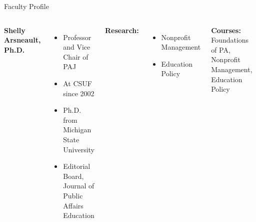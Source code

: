 \documentclass[10pt]{beamer}
\newlength{\imageheight}
\begin{document}
    \begin{frame}{Faculty Profile}
    \begin{columns}[T]
    \textbf{Shelly Arsneault, Ph.D.}
    \begin{itemize}
    \item Professor and Vice Chair of PAJ
    \item At CSUF since 2002
    \item Ph.D. from Michigan State University
    \item Editorial Board, Journal of Public Affairs Education
    \end{itemize}
    
    \textbf{Research:} 
    \begin{itemize}
    \item Nonprofit Management
    \item Education Policy
    \end{itemize}

    \textbf{Courses:} Foundations of PA, Nonprofit Management, Education Policy
    
    \vspace*{0.5cm}
    \includegraphics[height=\imageheight]{images/arsneault.png}
    \end{columns}
    \end{frame}
\end{document}
